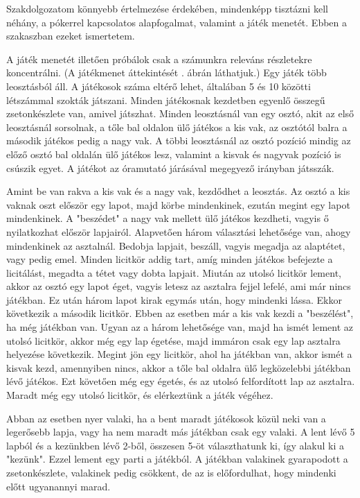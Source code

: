 

Szakdolgozatom könnyebb értelmezése érdekében, mindenképp tisztázni kell néhány, a pókerrel kapcsolatos alapfogalmat, valamint a játék menetét. Ebben a szakaszban ezeket ismertetem.


A játék menetét illetően próbálok csak a számunkra releváns részletekre koncentrálni. (A játékmenet áttekintését . ábrán láthatjuk.) Egy játék több leosztásból áll. A játékosok száma eltérő lehet, általában 5 és 10 közötti létszámmal szokták játszani. Minden játékosnak kezdetben egyenlő összegű zsetonkészlete van, amivel játszhat. Minden leosztásnál van egy osztó, akit az első leosztásnál sorsolnak, a tőle bal oldalon ülő játékos a kis vak, az osztótól balra a második játékos pedig a nagy vak. A többi leosztásnál az osztó pozíció mindig az előző osztó bal oldalán ülő játékos lesz, valamint a kisvak és nagyvak pozíció is csúszik egyet. A játékot az óramutató járásával megegyező irányban játsszák.

Amint be van rakva a kis vak és a nagy vak, kezdődhet a leosztás. Az osztó a kis vaknak oszt először egy lapot, majd körbe mindenkinek, ezután megint egy lapot mindenkinek. A "beszédet" a nagy vak mellett ülő játékos kezdheti, vagyis ő nyilatkozhat először lapjairól. Alapvetően három választási lehetősége van, ahogy mindenkinek az asztalnál. Bedobja lapjait, beszáll, vagyis megadja az alaptétet, vagy pedig emel. Minden licitkör addig tart, amíg minden játékos befejezte a licitálást, megadta a tétet vagy dobta lapjait. Miután az utolsó licitkör lement, akkor az osztó egy lapot éget, vagyis letesz az asztalra fejjel lefelé, ami már nincs játékban. Ez után három lapot kirak egymás után, hogy mindenki lássa. Ekkor következik a második licitkör. Ebben az esetben már a kis vak kezdi a "beszélést", ha még játékban van. Ugyan az a három lehetősége van, majd ha ismét lement az utolsó licitkör, akkor még egy lap égetése, majd immáron csak egy lap asztalra helyezése következik. Megint jön egy licitkör, ahol ha játékban van, akkor ismét a kisvak kezd, amennyiben nincs, akkor a tőle bal oldalra ülő legközelebbi játékban lévő játékos. Ezt követően még egy égetés, és az utolsó felfordított lap az asztalra. Maradt még egy utolsó licitkör, és elérkeztünk a játék végéhez.

Abban az esetben nyer valaki, ha a bent maradt játékosok közül neki van a legerősebb lapja, vagy ha nem maradt más játékban csak egy valaki. A lent lévő 5 lapból és a kezünkben lévő 2-ből, összesen 5-öt választhatunk ki, így alakul ki a "kezünk". Ezzel lement egy parti a játékból. A játékban valakinek gyarapodott a zsetonkészlete, valakinek pedig csökkent, de az is előfordulhat, hogy mindenki előtt ugyanannyi marad.


